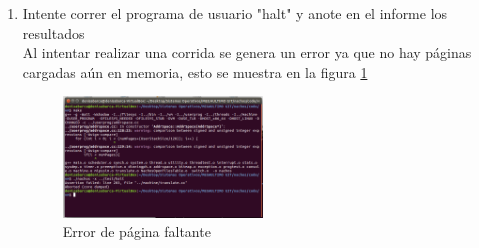 \documentclass[11pt]{article}
\begin{document}
\begin{enumerate}
\begin{enumerate}
      \item Intente correr el programa de usuario "halt" y anote en el informe los resultados\\
        Al intentar realizar una corrida se genera un error ya que no hay páginas cargadas aún en memoria, esto se muestra en la figura \ref{fig:01}
\begin{figure}[bh]
  \begin{center}
    \includegraphics[width=0.5\textwidth]{Resultado_primer_Halt.PNG}
    \caption{Error de página faltante}
    \label{fig:01}
  \end{center}
\end{figure}
	  \end{enumerate}
	  
	\end{enumerate}
\end{document}
